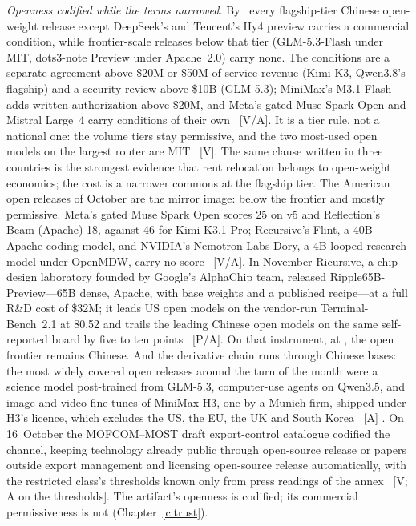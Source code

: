 \emph{Openness codified while the terms narrowed.} By \datafreeze\ every flagship-tier Chinese open-weight release except DeepSeek's and Tencent's Hy4 preview carries a commercial condition, while frontier-scale releases below that tier (GLM-5.3-Flash under MIT, dots3-note Preview under Apache~2.0) carry none. The conditions are a separate agreement above \$20M or \$50M of service revenue (Kimi K3, Qwen3.8's flagship) and a security review above \$10B (GLM-5.3); MiniMax's M3.1 Flash adds written authorization above \$20M, and Meta's gated Muse Spark Open and Mistral Large~4 carry conditions of their own~\cite{kimi-k3-license-maas,qwen38-weights,glm53,mdl-minimax-m31,mdl-cleus-oct26,mdl-mistral-large4} [V/A]. It is a tier rule, not a national one: the volume tiers stay permissive, and the two most-used open models on the largest router are MIT~\cite{mdl-openrouter-oct26} [V]. The same clause written in three countries is the strongest evidence that rent relocation belongs to open-weight economics; the cost is a narrower commons at the flagship tier. The American open releases of October are the mirror image: below the frontier and mostly permissive. Meta's gated Muse Spark Open scores 25 on v5 and Reflection's Beam (Apache) 18, against 46 for Kimi K3.1 Pro; Recursive's Flint, a 40B Apache coding model, and NVIDIA's Nemotron Labs Dory, a 4B looped research model under OpenMDW, carry no score~\cite{lit-beam-aa,lit-flint,lit-dory} [V/A]. In November Ricursive, a chip-design laboratory founded by Google's AlphaChip team, released Ripple65B-Preview---65B dense, Apache, with base weights and a published recipe---at a full R\&D cost of \$32M; it leads US open models on the vendor-run Terminal-Bench~2.1 at 80.52 and trails the leading Chinese open models on the same self-reported board by five to ten points~\cite{lit-ripple,lit-witteveen-ripple} [P/A]. On that instrument, at \datafreeze, the open frontier remains Chinese. And the derivative chain runs through Chinese bases: the most widely covered open releases around the turn of the month were a science model post-trained from GLM-5.3, computer-use agents on Qwen3.5, and image and video fine-tunes of MiniMax H3, one by a Munich firm, shipped under H3's licence, which excludes the US, the EU, the UK and South Korea~\cite{lit-hydrogen,lit-northcua,lit-pruna,lit-pika} [A] . On 16~October the MOFCOM--MOST draft export-control catalogue codified the channel, keeping technology already public through open-source release or papers outside export management and licensing open-source release automatically, with the restricted class's thresholds known only from press readings of the annex~\cite{gov-mofcom-catalogue,gov-catalogue-thresholds} [V; A on the thresholds]. The artifact's openness is codified; its commercial permissiveness is not (Chapter~\ref{c:trust}).

